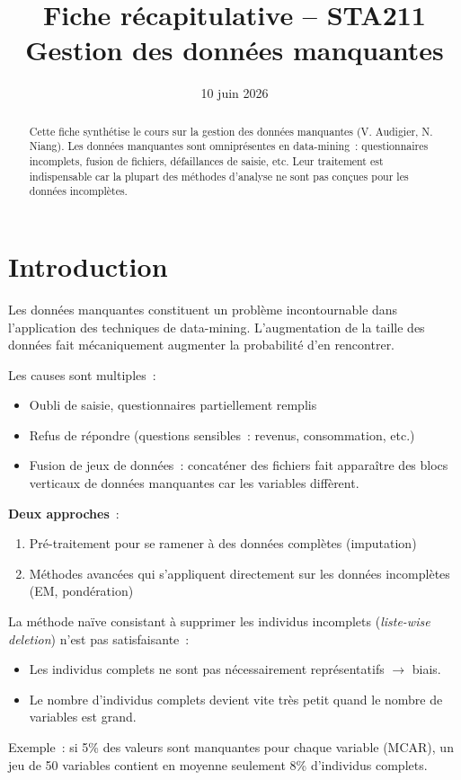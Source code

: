 \documentclass[a4paper,11pt]{article}
\title{\textbf{Fiche récapitulative -- STA211}\\[4pt]
\large Gestion des données manquantes}
\author{}
\date{10 juin 2026}
\theoremstyle{definition}
\theoremstyle{remark}
\begin{document}
\maketitle
\thispagestyle{empty}

\begin{abstract}
Cette fiche synthétise le cours sur la gestion des données manquantes
(V. Audigier, N. Niang). Les données manquantes sont omniprésentes en
data-mining~: questionnaires incomplets, fusion de fichiers, défaillances
de saisie, etc. Leur traitement est indispensable car la plupart des
méthodes d'analyse ne sont pas conçues pour les données incomplètes.
\end{abstract}

\vfill
\tableofcontents
\newpage

\section{Introduction}

Les données manquantes constituent un problème incontournable dans
l'application des techniques de data-mining. L'augmentation de la taille
des données fait mécaniquement augmenter la probabilité d'en rencontrer.

Les causes sont multiples~:
\begin{itemize}
  \item Oubli de saisie, questionnaires partiellement remplis
  \item Refus de répondre (questions sensibles~: revenus, consommation,
    etc.)
  \item Fusion de jeux de données~: concaténer des fichiers fait
    apparaître des blocs verticaux de données manquantes car les
    variables diffèrent.
\end{itemize}

\textbf{Deux approches}~:
\begin{enumerate}
  \item Pré-traitement pour se ramener à des données complètes (imputation)
  \item Méthodes avancées qui s'appliquent directement sur les données
    incomplètes (EM, pondération)
\end{enumerate}

La méthode naïve consistant à supprimer les individus incomplets
(\textit{liste-wise deletion}) n'est pas satisfaisante~:
\begin{itemize}
  \item Les individus complets ne sont pas nécessairement représentatifs
    $\rightarrow$ biais.
  \item Le nombre d'individus complets devient vite très petit quand le
    nombre de variables est grand.
\end{itemize}
Exemple~: si 5\% des valeurs sont manquantes pour chaque variable (MCAR),
un jeu de 50 variables contient en moyenne seulement 8\% d'individus
complets.
\end{document}

